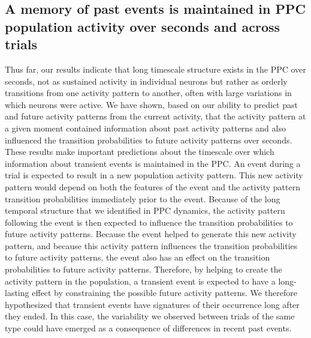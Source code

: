 \subsection{A memory of past events is maintained in PPC population activity over seconds and across trials} \label{sec:chap3_past_events}

Thus far, our results indicate that long timescale structure exists in the PPC over seconds, not as sustained activity in individual neurons but rather as orderly transitions from one activity pattern to another, often with large variations in which neurons were active. We have shown, based on our ability to predict past and future activity patterns from the current activity, that the activity pattern at a given moment contained information about past activity patterns and also influenced the transition probabilities to future activity patterns over seconds. These results make important predictions about the timescale over which information about transient events is maintained in the PPC. An event during a trial is expected to result in a new population activity pattern. This new activity pattern would depend on both the features of the event and the activity pattern transition probabilities immediately prior to the event. Because of the long temporal structure that we identified in PPC dynamics, the activity pattern following the event is then expected to influence the transition probabilities to future activity patterns. Because the event helped to generate this new activity pattern, and because this activity pattern influences the transition probabilities to future activity patterns, the event also has an effect on the transition probabilities to future activity patterns. Therefore, by helping to create the activity pattern in the population, a transient event is expected to have a long-lasting effect by constraining the possible future activity patterns. We therefore hypothesized that transient events have signatures of their occurrence long after they ended. In this case, the variability we observed between trials of the same type could have emerged as a consequence of differences in recent past events.

